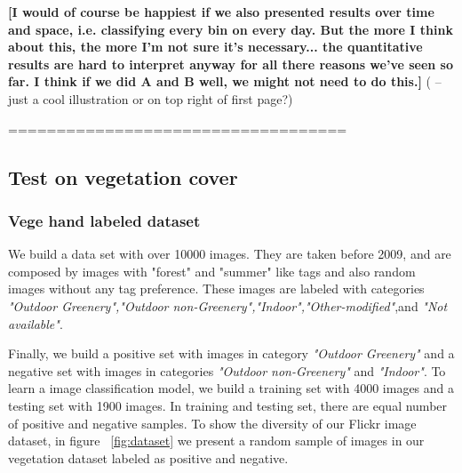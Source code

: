 \textbf{
[I would of course be happiest if we also presented results over time and space, i.e. classifying every bin on every day. But the more I think about this, the more I'm not sure it's necessary... the quantitative results are hard to interpret anyway for all there reasons we've seen so far. I think if we did A and B well, we might not need to do this.]
}( -- just a cool illustration or on top right of first page?)

\hfill \break
\hfill \break
===================================
\hfill \break
\hfill \break

\subsection{Test on vegetation cover}
\subsubsection*{Vege hand labeled dataset}

We build a data set with over 10000 images. They are taken before 2009, and are composed by images with "forest" and "summer" like tags and also random images without any tag preference. These images are labeled with categories 
\textit{"Outdoor Greenery","Outdoor non-Greenery","Indoor","Other-modified"},and \textit{"Not available"}.

Finally, we build a positive set with images in category \textit{"Outdoor Greenery"} and a negative set 
with images in categories \textit{"Outdoor non-Greenery"} and \textit{"Indoor"}. To learn a image classification model, we build a training set with 4000 images and a testing set with 1900 images. In training and testing set, there are equal number of positive and negative samples.
To show the diversity of our Flickr image dataset, in figure ~\ref{fig:dataset} we present a random sample of images in our vegetation dataset labeled as positive and negative.









